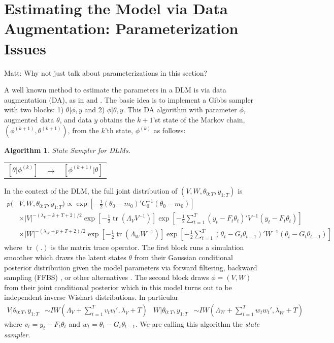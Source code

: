 \documentclass{article}
\newtheorem{alg}{Algorithm}
\DeclareMathOperator{\tr}{tr}
\newcommand{\matt}[1]{{\color{red} Matt: #1}}
\begin{document}
\section{Estimating the Model via Data Augmentation: Parameterization Issues}\label{sec:DLMest}
\matt{Why not just talk about parameterizations in this section?}

A well known method to estimate the parameters in a DLM is via data augmentation (DA), as in \citet{fruhwirth1994data} and \citet{carter1994gibbs}. The basic idea is to implement a Gibbs sampler with two blocks: 1) $\theta|\phi,y$ and 2) $\phi|\theta,y$. This DA algorithm with parameter $\phi$, augmented data $\theta$, and data $y$ obtains the $k+1$'st state of the Markov chain, $(\phi^{(k+1)},\theta^{(k+1)})$, from the $k$'th state, $\phi^{(k)}$ as follows:
\begin{alg}State Sampler for DLMs.\label{alg:DA}\\
  \begin{center}
    \begin{tabular}{lll}
      $[\theta|\phi^{(k)}]$& $\to$& $[\phi^{(k+1)}|\theta]$
    \end{tabular}
  \end{center}
\end{alg}
In the context of the DLM, the full joint distribution of $(V,W,\theta_{0:T},y_{1:T})$ is
\begin{align}
  p(&V,W,\theta_{0:T},y_{1:T}) \propto \exp\left[-\frac{1}{2}(\theta_0-m_0)'C_0^{-1}(\theta_0-m_0)\right] \nonumber\\
  &\times   |V|^{-(\lambda_V + k + T + 2)/2}\exp\left[-\frac{1}{2}\tr\left(\Lambda_VV^{-1}\right)\right] \exp\left[-\frac{1}{2}\sum_{t=1}^T(y_t - F_t\theta_t)'V^{-1}(y_t - F_t\theta_t)\right] \nonumber\\
   & \times |W|^{-(\lambda_W + p + T + 2)/2}\exp\left[-\frac{1}{2}\tr\left(\Lambda_WW^{-1}\right)\right]\exp\left[-\frac{1}{2}\sum_{t=1}^T(\theta_t-G_t\theta_{t-1})'W^{-1}(\theta_t-G_t\theta_{t-1})\right]\label{dlmjoint}
 \end{align}
where $\tr(.)$ is the matrix trace operator. The first block runs a simulation smoother which draws the latent states $\theta$ from their Gaussian conditional posterior distribution given the model parameters via forward filtering, backward sampling (FFBS) \citet{fruhwirth1994data, carter1994gibbs}, or other alternatives \citet{koopman1993disturbance, de1995simulation, mccausland2011simulation}. The second block draws $\phi=(V,W)$ from their joint conditional posterior which in this model turns out to be independent inverse Wishart distributions. In particular
\begin{align}
  V|\theta_{0:T},y_{1:T} &\sim IW\left(\Lambda_V + \sum_{t=1}^Tv_tv_t',\lambda_V + T\right) &
  W|\theta_{0:T},y_{1:T} &\sim IW\left(\Lambda_W + \sum_{t=1}^Tw_tw_t',\lambda_{W} + T\right) \label{eq:VWcond}
\end{align}
where $v_t = y_t - F_t\theta_t$ and $w_t = \theta_t - G_t\theta_{t-1}$. We are calling this algorithm the {\it state sampler}.
\end{document}
